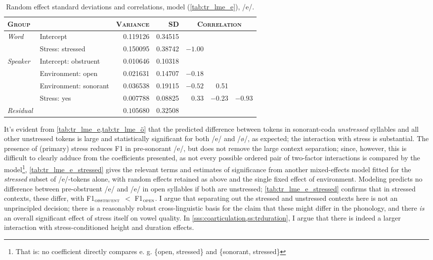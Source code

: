 \begin{table}[H]
  \centering
  \begin{tabular}{llrrrrr}
    \toprule
    \textsc{Group} & \textsc{} & \textsc{Variance} & \textsc{SD} & \multicolumn{3}{c}{\textsc{Correlation}}\\
    \midrule
    \multirow{2}{*}{\textit{Word}} & Intercept & 0.119126 & 0.34515  \\
                & Stress: stressed & 0.150095 & 0.38742 & $-1.00$  \\
    \midrule
    \multirow{4}{*}{\textit{Speaker}} & Intercept: obstruent & 0.010646 & 0.10318  \\
                & Environment: open                        & 0.021631 & 0.14707   & $-0.18$  \\
                & Environment: sonorant                    & 0.036538 & 0.19115  & $-0.52$ &  0.51    \\
                & Stress: yes                              & 0.007788 & 0.08825  & 0.33    & $-0.23$ &$-0.93$ \\
    \midrule
    \textit{Residual} & & $0.105680$ & $0.32508$ \\
    \bottomrule
  \end{tabular}
  \caption[, /e/]{Random effect standard deviations and correlations, model  (\cref{tab:tr_lme_e}), /e/.}
  \label{tab:tr_lme_e_random}
\end{table}

It's evident from \cref{tab:tr_lme_e,tab:tr_lme_ö} that the predicted difference between tokens in sonorant-coda \emph{unstressed} syllables and all other unstressed tokens is large and statistically significant for both /e/ and /\o/, as expected; the interaction with stress is substantial. The presence of (primary) stress reduces F1 in pre-sonorant /e/, but does not remove the large context separation; since, however, this is difficult to clearly adduce from the coefficients presented, as not every possible ordered pair of two-factor interactions is compared by the model\footnote{That is: no coefficient directly compares e. g. \{open, stressed\} and \{sonorant, stressed\}}, \cref{tab:tr_lme_e_stressed} gives the relevant terms and estimates of significance from another mixed-effects model fitted for the \emph{stressed} subset of /e/-tokens alone, with random effects retained as above and the single fixed effect of environment. Modeling predicts no difference between pre-obstruent /e/ and /e/ in open syllables if both are unstressed; \cref{tab:tr_lme_e_stressed} confirms that in stressed contexts, these differ, with F1$_\textsc{obstruent}$ $<$ F1$_\textsc{open}$. I argue that separating out the stressed and unstressed contexts here is not an unprincipled decision; there is a reasonably robust cross-linguistic basis for the claim that these might differ in the phonology, and there \emph{is} an overall significant effect of stress itself on vowel quality. In \cref{sss:coarticulation,ss:trduration}, I argue that there is indeed a larger interaction with stress-conditioned height and duration effects.

